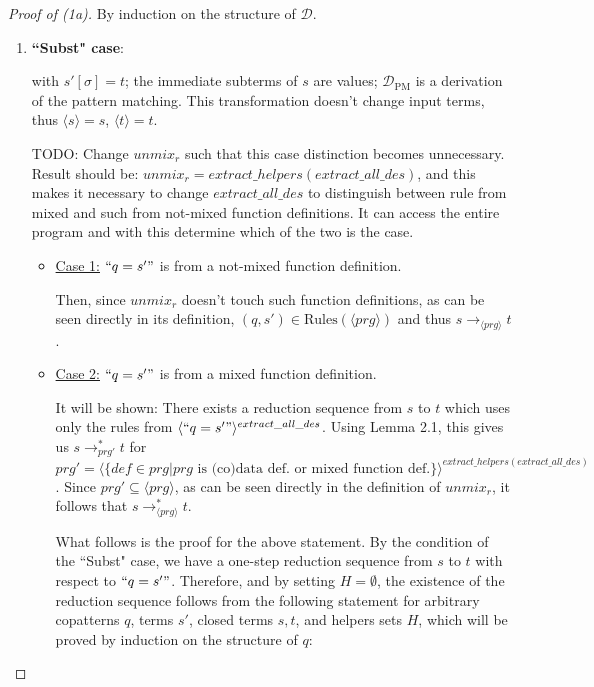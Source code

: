 \documentclass[11pt]{article} %
\begin{document}
\begin{proof}[Proof of (1a)] By induction on the structure of $\mathcal{D}$.

\begin{enumerate}

\item \textbf{``Subst" case}:

\begin{prooftree}
\end{prooftree}

with $s'[\sigma] = t$; the immediate subterms of $s$ are values; $\mathcal{D}_{\textrm{PM}}$ is a derivation of the pattern matching. This transformation doesn't change input terms, thus $\langle s \rangle = s$, $\langle t \rangle = t$.

TODO: Change $unmix_r$ such that this case distinction becomes unnecessary. Result should be: $unmix_r = extract\_helpers(extract\_all\_des)$, and this makes it necessary to change $extract\_all\_des$ to distinguish between rule from mixed and such from not-mixed function definitions. It can access the entire program and with this determine which of the two is the case.

\begin{itemize}

\item \underline{Case 1:} $`` q = s' "$ is from a not-mixed function definition.

Then, since $unmix_r$ doesn't touch such function definitions, as can be seen directly in its definition, $(q, s') \in \textrm{Rules}(\langle prg \rangle)$ and thus $s \longrightarrow_{\langle prg \rangle} t$.

\item \underline{Case 2:} $`` q = s' "$ is from a mixed function definition.

It will be shown: There exists a reduction sequence from $s$ to $t$ which uses only the rules from $\langle `` q = s' " \rangle^{extract\_all\_des}$. Using Lemma 2.1, this gives us $s \longrightarrow^*_{prg'} t$ for $prg' = \langle \{ def \in prg | prg \textrm{ is (co)data def. or mixed function def.} \} \rangle^{extract\_helpers(extract\_all\_des)}$. Since $prg' \subseteq \langle prg \rangle$, as can be seen directly in the definition of $unmix_r$, it follows that $s \longrightarrow^*_{\langle prg \rangle} t$.

What follows is the proof for the above statement. By the condition of the ``Subst" case, we have a one-step reduction sequence from $s$ to $t$ with respect to $`` q = s' "$. Therefore, and by setting $H = \emptyset$, the existence of the reduction sequence follows from the following statement for arbitrary copatterns $q$, terms $s'$, closed terms $s,t$, and helpers sets $H$, which will be proved by induction on the structure of $q$:


\end{itemize}
\end{enumerate}
\end{proof}
\end{document}

